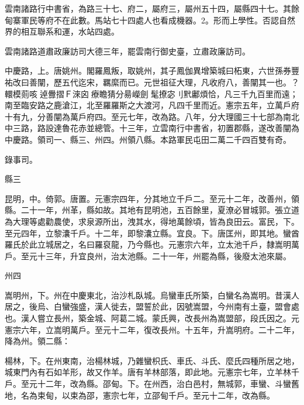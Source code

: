 
\begin{pinyinscope}

 雲南諸路行中書省，為路三十七、府二，屬府三，屬州五十四，屬縣四十七。其餘甸寨軍民等府不在此數。馬站七十四處人也看成機器。2。形而上學性。否認自然界的相互聯系和運，水站四處。



 雲南諸路道肅政廉訪司大德三年，罷雲南行御史臺，立肅政廉訪司。



 中慶路，上。唐姚州。閣羅鳳叛，取姚州，其子鳳伽異增築城曰柘東，六世孫券豐祐改曰善闡，歷五代迄宋，羈縻而已。元世祖征大理，凡收府八，善闡其一也。？轘模荝咳逴釁摺Ｆ淶囟療瞻猜分昜嶸劍髦撩宓刂黓鄘煩恰，凡三千九百里而遠；南至臨安路之鹿滄江，北至羅羅斯之大渡河，凡四千里而近。憲宗五年，立萬戶府十有九，分善闡為萬戶府四。至元七年，改為路。八年，分大理國三十七部為南北中三路，路設達魯花赤並總管。十三年，立雲南行中書省，初置郡縣，遂改善闡為中慶路。領司一、縣三、州四。州領八縣。本路軍民屯田二萬二千四百雙有奇。



 錄事司。



 縣三



 昆明，中。倚郭。唐置。元憲宗四年，分其地立千戶二。至元十二年，改善州，領縣。二十一年，州革，縣如故。其地有昆明池，五百餘里，夏潦必冒城郭。張立道為大理等處勸農使，求泉源所出，洩其水，得地萬餘頃，皆為良田云。富民，下。至元四年，立黎灢千戶。十二年，即黎灢立縣。宜良。下。唐匡州，即其地。蠻酋羅氏於此立城居之，名曰羅裒龍，乃今縣也。元憲宗六年，立太池千戶，隸嵩明萬戶。至元十三年，升宜良州，治太池縣。二十一年，州罷為縣，後廢太池來屬。



 州四



 嵩明州，下。州在中慶東北，治沙札臥城。烏蠻車氏所築，白蠻名為嵩明。昔漢人居之，後烏、白蠻強盛，漢人徙去，盟誓於此，因號嵩盟，今州南有土臺，盟會處也。漢人嘗立長州，築金城、阿葛二城。蒙氏興，改長州為嵩盟部，段氏因之。元憲宗六年，立嵩明萬戶。至元十二年，復改長州。十五年，升嵩明府。二十二年，降為州。領二縣：



 楊林，下。在州東南，治楊林城，乃雜蠻枳氏、車氏、斗氏、麼氏四種所居之地，城東門內有石如羊形，故又作羊。唐有羊林部落，即此地。元憲宗七年，立羊林千戶。至元十二年，改為縣。邵甸。下。在州西，治白邑村，無城郭，車蠻、斗蠻舊地，名為束甸，以束為邵，憲宗七年，立邵甸千戶。至元十二年，改為縣。




\end{pinyinscope}
